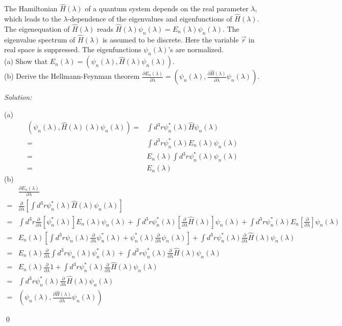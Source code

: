 \documentclass[12pt,a4paper]{article}
\newenvironment{problem}[2][Problem]{\begin{trivlist}
\item[\hskip \labelsep {\bfseries #1}\hskip \labelsep {\bfseries #2.}]}{\end{trivlist}}
\newenvironment{sol}
    {\emph{Solution:}
    }
    {
    \qed
    }
\begin{document}
\begin{problem}{2}
The Hamiltonian $\hat{H}(\lambda)$ of a quantum system depends on the real parameter $\lambda$, which leads to the $\lambda$-dependence of the eigenvalues and eigenfunctions of $\hat{H}(\lambda)$. The eigenequation of $\hat{H}(\lambda)$ reads $\hat{H}(\lambda)\psi_n(\lambda)=E_n(\lambda)\psi_n(\lambda)$. The eigenvalue spectrum of $\hat{H}(\lambda)$ is assumed to be discrete. Here the variable $\vec{r}$ in real space is suppressed. The eigenfunctions $\psi_n(\lambda)$'s are normalized.\\
(a) Show that $E_n(\lambda)=(\psi_n(\lambda),\hat{H}(\lambda)\psi_n(\lambda))$.\\
(b) Derive the Hellmann-Feynman theorem $\frac{\partial E_n(\lambda)}{\partial\lambda}=(\psi_n(\lambda),\frac{\partial\hat{H}(\lambda)}{\partial\lambda}\psi_n(\lambda))$.
\end{problem}
\begin{sol}
(a)
\begin{align}
\nonumber(\psi_n(\lambda),\hat{H}(\lambda)(\lambda)\psi_n(\lambda))=&\int d^3r\psi_n^*(\lambda)\hat{H}\psi_n(\lambda)\\
\nonumber=&\int d^3r\psi_n^*(\lambda)E_n(\lambda)\psi_n(\lambda)\\
\nonumber=&E_n(\lambda)\int d^3r\psi_n^*(\lambda)\psi_n(\lambda)\\
=&E_n(\lambda)
\end{align}
(b)
\begin{align}
\nonumber&\frac{\partial E_n(\lambda)}{\partial\lambda}\\
\nonumber=&\frac{\partial}{\partial\lambda}[\int d^3r\psi_n^*(\lambda)\hat{H}(\lambda)\psi_n(\lambda)]\\
\nonumber=&\int d^3r\frac{\partial}{\partial\lambda}[\psi_n^*(\lambda)]E_n(\lambda)\psi_n(\lambda)+\int d^3r\psi_n^*(\lambda)[\frac{\partial}{\partial\lambda}\hat{H}(\lambda)]\psi_n(\lambda)+\int d^3r\psi_n^*(\lambda)E_n[\frac{\partial}{\partial\lambda}]\psi_n(\lambda)\\
\nonumber=&E_n(\lambda)[\int d^3r\psi_n(\lambda)\frac{\partial}{\partial\lambda}\psi_n^*(\lambda)+\psi_n^*(\lambda)\frac{\partial}{\partial\lambda}\psi_n(\lambda)]+\int d^3r\psi_n^*(\lambda)\frac{\partial}{\partial\lambda}\hat{H}(\lambda)\psi_n(\lambda)\\
\nonumber=&E_n(\lambda)\frac{\partial}{\partial\lambda}\int d^3r\psi_n(\lambda)\psi_n^*(\lambda)+\int d^3r\psi_n^*(\lambda)\frac{\partial}{\partial\lambda}\hat{H}(\lambda)\psi_n(\lambda)\\
\nonumber=&E_n(\lambda)\frac{\partial}{\partial\lambda}1+\int d^3r\psi_n^*(\lambda)\frac{\partial}{\partial\lambda}\hat{H}(\lambda)\psi_n(\lambda)\\
\nonumber=&\int d^3r\psi_n^*(\lambda)\frac{\partial}{\partial\lambda}\hat{H}(\lambda)\psi_n(\lambda)\\
=&(\psi_n(\lambda),\frac{\partial\hat{H}(\lambda)}{\partial\lambda}\psi_n(\lambda))
\end{align}
\end{sol}
\end{document}
